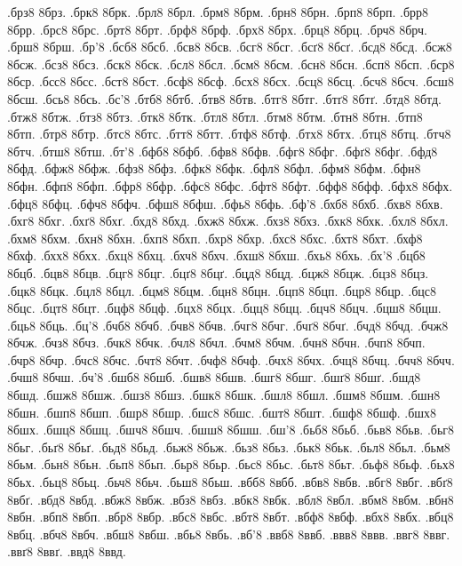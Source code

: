 {.брз8
8брз.
.брк8
8брк.
.брл8
8брл.
.брм8
8брм.
.брн8
8брн.
.брп8
8брп.
.брр8
8брр.
.брс8
8брс.
.брт8
8брт.
.брф8
8брф.
.брх8
8брх.
.брц8
8брц.
.брч8
8брч.
.брш8
8брш.
.бр'8
.бсб8
8бсб.
.бсв8
8бсв.
.бсг8
8бсг.
.бсґ8
8бсґ.
.бсд8
8бсд.
.бсж8
8бсж.
.бсз8
8бсз.
.бск8
8бск.
.бсл8
8бсл.
.бсм8
8бсм.
.бсн8
8бсн.
.бсп8
8бсп.
.бср8
8бср.
.бсс8
8бсс.
.бст8
8бст.
.бсф8
8бсф.
.бсх8
8бсх.
.бсц8
8бсц.
.бсч8
8бсч.
.бсш8
8бсш.
.бсь8
8бсь.
.бс'8
.бтб8
8бтб.
.бтв8
8бтв.
.бтг8
8бтг.
.бтґ8
8бтґ.
.бтд8
8бтд.
.бтж8
8бтж.
.бтз8
8бтз.
.бтк8
8бтк.
.бтл8
8бтл.
.бтм8
8бтм.
.бтн8
8бтн.
.бтп8
8бтп.
.бтр8
8бтр.
.бтс8
8бтс.
.бтт8
8бтт.
.бтф8
8бтф.
.бтх8
8бтх.
.бтц8
8бтц.
.бтч8
8бтч.
.бтш8
8бтш.
.бт'8
.бфб8
8бфб.
.бфв8
8бфв.
.бфг8
8бфг.
.бфґ8
8бфґ.
.бфд8
8бфд.
.бфж8
8бфж.
.бфз8
8бфз.
.бфк8
8бфк.
.бфл8
8бфл.
.бфм8
8бфм.
.бфн8
8бфн.
.бфп8
8бфп.
.бфр8
8бфр.
.бфс8
8бфс.
.бфт8
8бфт.
.бфф8
8бфф.
.бфх8
8бфх.
.бфц8
8бфц.
.бфч8
8бфч.
.бфш8
8бфш.
.бфь8
8бфь.
.бф'8
.бхб8
8бхб.
.бхв8
8бхв.
.бхг8
8бхг.
.бхґ8
8бхґ.
.бхд8
8бхд.
.бхж8
8бхж.
.бхз8
8бхз.
.бхк8
8бхк.
.бхл8
8бхл.
.бхм8
8бхм.
.бхн8
8бхн.
.бхп8
8бхп.
.бхр8
8бхр.
.бхс8
8бхс.
.бхт8
8бхт.
.бхф8
8бхф.
.бхх8
8бхх.
.бхц8
8бхц.
.бхч8
8бхч.
.бхш8
8бхш.
.бхь8
8бхь.
.бх'8
.бцб8
8бцб.
.бцв8
8бцв.
.бцг8
8бцг.
.бцґ8
8бцґ.
.бцд8
8бцд.
.бцж8
8бцж.
.бцз8
8бцз.
.бцк8
8бцк.
.бцл8
8бцл.
.бцм8
8бцм.
.бцн8
8бцн.
.бцп8
8бцп.
.бцр8
8бцр.
.бцс8
8бцс.
.бцт8
8бцт.
.бцф8
8бцф.
.бцх8
8бцх.
.бцц8
8бцц.
.бцч8
8бцч.
.бцш8
8бцш.
.бць8
8бць.
.бц'8
.бчб8
8бчб.
.бчв8
8бчв.
.бчг8
8бчг.
.бчґ8
8бчґ.
.бчд8
8бчд.
.бчж8
8бчж.
.бчз8
8бчз.
.бчк8
8бчк.
.бчл8
8бчл.
.бчм8
8бчм.
.бчн8
8бчн.
.бчп8
8бчп.
.бчр8
8бчр.
.бчс8
8бчс.
.бчт8
8бчт.
.бчф8
8бчф.
.бчх8
8бчх.
.бчц8
8бчц.
.бчч8
8бчч.
.бчш8
8бчш.
.бч'8
.бшб8
8бшб.
.бшв8
8бшв.
.бшг8
8бшг.
.бшґ8
8бшґ.
.бшд8
8бшд.
.бшж8
8бшж.
.бшз8
8бшз.
.бшк8
8бшк.
.бшл8
8бшл.
.бшм8
8бшм.
.бшн8
8бшн.
.бшп8
8бшп.
.бшр8
8бшр.
.бшс8
8бшс.
.бшт8
8бшт.
.бшф8
8бшф.
.бшх8
8бшх.
.бшц8
8бшц.
.бшч8
8бшч.
.бшш8
8бшш.
.бш'8
.бьб8
8бьб.
.бьв8
8бьв.
.бьг8
8бьг.
.бьґ8
8бьґ.
.бьд8
8бьд.
.бьж8
8бьж.
.бьз8
8бьз.
.бьк8
8бьк.
.бьл8
8бьл.
.бьм8
8бьм.
.бьн8
8бьн.
.бьп8
8бьп.
.бьр8
8бьр.
.бьс8
8бьс.
.бьт8
8бьт.
.бьф8
8бьф.
.бьх8
8бьх.
.бьц8
8бьц.
.бьч8
8бьч.
.бьш8
8бьш.
.вбб8
8вбб.
.вбв8
8вбв.
.вбг8
8вбг.
.вбґ8
8вбґ.
.вбд8
8вбд.
.вбж8
8вбж.
.вбз8
8вбз.
.вбк8
8вбк.
.вбл8
8вбл.
.вбм8
8вбм.
.вбн8
8вбн.
.вбп8
8вбп.
.вбр8
8вбр.
.вбс8
8вбс.
.вбт8
8вбт.
.вбф8
8вбф.
.вбх8
8вбх.
.вбц8
8вбц.
.вбч8
8вбч.
.вбш8
8вбш.
.вбь8
8вбь.
.вб'8
.ввб8
8ввб.
.ввв8
8ввв.
.ввг8
8ввг.
.ввґ8
8ввґ.
.ввд8
8ввд.
}
